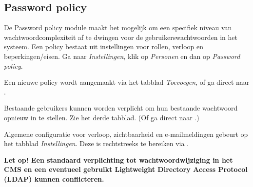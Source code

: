 \subsection{Password policy}\label{passwordpolicy}

De Password policy module maakt het mogelijk om een specifiek niveau van wachtwoordcomplexiteit af te dwingen voor de gebruikerswachtwoorden in het systeem. Een policy bestaat uit instellingen voor rollen, verloop en beperkingen/eisen. Ga naar \emph{Instellingen}, klik op \emph{Personen} en dan op \emph{Password policy}.

Een nieuwe policy wordt aangemaakt via het tabblad \emph{Toevoegen}, of ga direct naar .

Bestaande gebruikers kunnen worden verplicht om hun bestaande wachtwoord opnieuw in te stellen. Zie het derde tabblad. (Of ga direct naar .)

Algemene configuratie voor verloop, zichtbaarheid en e-mailmeldingen gebeurt op het tabblad \emph{Instellingen}. Deze is rechtstreeks te bereiken via .

\textbf{Let op! Een standaard verplichting tot wachtwoordwijziging in het CMS en een eventueel gebruikt Lightweight Directory Access Protocol (LDAP) kunnen conflicteren.}